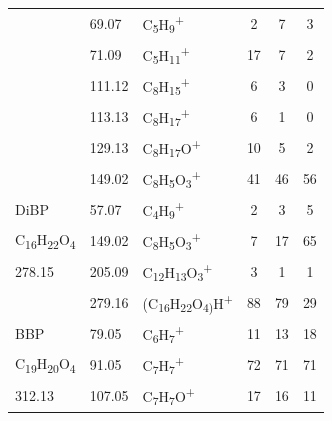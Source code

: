 {\begin{longtable}[c]{lllccc}
                                                         & 69.07  & C\textsubscript{5}H\textsubscript{9}\textsuperscript{+}                   & 2  & 7  & 3  \\
                                                         & 71.09  & C\textsubscript{5}H\textsubscript{11}\textsuperscript{+}                  & 17 & 7  & 2  \\
                                                         & 111.12 & C\textsubscript{8}H\textsubscript{15}\textsuperscript{+}                  & 6  & 3  & 0  \\
                                                         & 113.13 & C\textsubscript{8}H\textsubscript{17}\textsuperscript{+}                  & 6  & 1  & 0  \\
                                                         & 129.13 & C\textsubscript{8}H\textsubscript{17}O\textsuperscript{+}                 & 10 & 5  & 2  \\
                                                         & 149.02 & C\textsubscript{8}H\textsubscript{5}O\textsubscript{3}\textsuperscript{+} & 41 & 46 & 56 \\
\hline
DiBP      & 57.07                & C\textsubscript{4}H\textsubscript{9}\textsuperscript{+}                           & 2            & 3            & 5            \\
C\textsubscript{16}H\textsubscript{22}O\textsubscript{4}          & 149.02               & C\textsubscript{8}H\textsubscript{5}O\textsubscript{3}\textsuperscript{+}      & 7            & 17           & 65           \\
278.15          & 205.09               & C\textsubscript{12}H\textsubscript{13}O\textsubscript{3}\textsuperscript{+}    & 3            & 1            & 1            \\
          & 279.16               & (C\textsubscript{16}H\textsubscript{22}O\textsubscript{4)}H\textsuperscript{+} & 88           & 79           & 29           \\
\hline
BBP       & 79.05                & C\textsubscript{6}H\textsubscript{7}\textsuperscript{+}                           & 11           & 13           & 18           \\
C\textsubscript{19}H\textsubscript{20}O\textsubscript{4}          & 91.05                & C\textsubscript{7}H\textsubscript{7}\textsuperscript{+}                           & 72           & 71           & 71           \\
312.13          & 107.05               & C\textsubscript{7}H\textsubscript{7}O\textsuperscript{+}                          & 17           & 16           & 11           \\

\end{longtable}}
